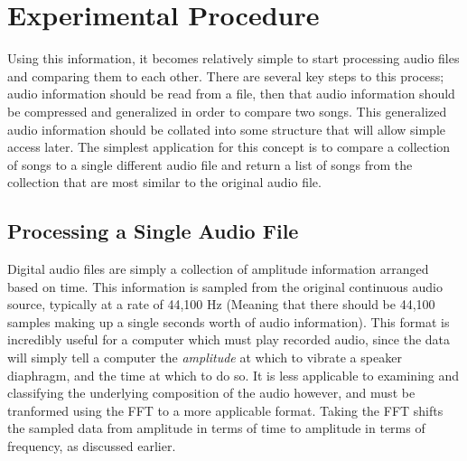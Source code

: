 \documentclass[conference]{IEEEtran}
\begin{document}
\section{Experimental Procedure}
Using this information, it becomes relatively simple to start processing audio files and comparing them to each other. There are several key steps to this process; audio information should be read from a file, then that audio information should be compressed and generalized in order to compare two songs. This generalized audio information should be collated into some structure that will allow simple access later. The simplest application for this concept is to compare a collection of songs to a single different audio file and return a list of songs from the collection that are most similar to the original audio file.
\subsection{Processing a Single Audio File}
Digital audio files are simply a collection of amplitude information arranged based on time. This information is sampled from the original continuous audio source, typically at a rate of 44,100 Hz (Meaning that there should be 44,100 samples making up a single seconds worth of audio information). This format is incredibly useful for a computer which must play recorded audio, since the data will simply tell a computer the \textit{amplitude} at which to vibrate a speaker diaphragm, and the time at which to do so. It is less applicable to examining and classifying the underlying composition of the audio however, and must be tranformed using the FFT to a more applicable format. Taking the FFT shifts the sampled data from amplitude in terms of time to amplitude in terms of frequency, as discussed earlier.
\end{document}
